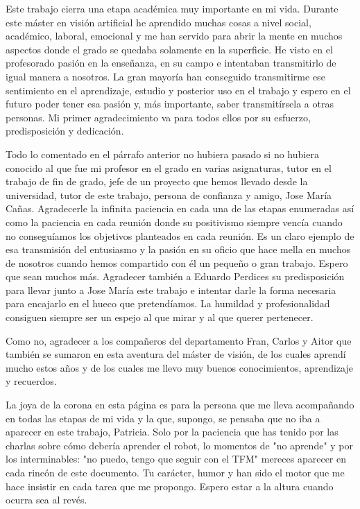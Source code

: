 Este trabajo cierra una etapa académica muy importante en mi vida. Durante este máster en visión artificial he aprendido muchas cosas a nivel social, académico, laboral, emocional y me han servido para abrir la mente en muchos aspectos donde el grado se quedaba solamente en la superficie. He visto en el profesorado pasión en la enseñanza, en su campo e intentaban transmitirlo de igual manera a nosotros. La gran mayoría han conseguido transmitirme ese sentimiento en el aprendizaje, estudio y posterior uso en el trabajo y espero en el futuro poder tener esa pasión y, más importante, saber transmitírsela a otras personas. Mi primer agradecimiento va para todos ellos por su esfuerzo, predisposición y dedicación.

Todo lo comentado en el párrafo anterior no hubiera pasado si no hubiera conocido al que fue mi profesor en el grado en varias asignaturas, tutor en el trabajo de fin de grado, jefe de un proyecto que hemos llevado desde la universidad, tutor de este trabajo, persona de confianza y amigo, Jose María Cañas. Agradecerle la infinita paciencia en cada una de las etapas enumeradas así como la paciencia en cada reunión donde su positivismo siempre vencía cuando no conseguíamos los objetivos planteados en cada reunión. Es un claro ejemplo de esa transmisión del entusiasmo y la pasión en su oficio que hace mella en muchos de nosotros cuando hemos compartido con él un pequeño o gran trabajo. Espero que sean muchos más. Agradecer también a Eduardo Perdices su predisposición para llevar junto a Jose María este trabajo e intentar darle la forma necesaria para encajarlo en el hueco que pretendíamos. La humildad y profesionalidad consiguen siempre ser un espejo al que mirar y al que querer pertenecer.

Como no, agradecer a los compañeros del departamento Fran, Carlos y Aitor que también se sumaron en esta aventura del máster de visión, de los cuales aprendí mucho estos años y de los cuales me llevo muy buenos conocimientos, aprendizaje y recuerdos.

La joya de la corona en esta página es para la persona que me lleva acompañando en todas las etapas de mi vida y la que, supongo, se pensaba que no iba a aparecer en este trabajo, Patricia. Solo por la paciencia que has tenido por las charlas sobre cómo debería aprender el robot, lo momentos de "no aprende" y por los interminables: "no puedo, tengo que seguir con el TFM" mereces aparecer en cada rincón de este documento. Tu carácter, humor y  han sido el motor que me hace insistir en cada tarea que me propongo. Espero estar a la altura cuando ocurra sea al revés.